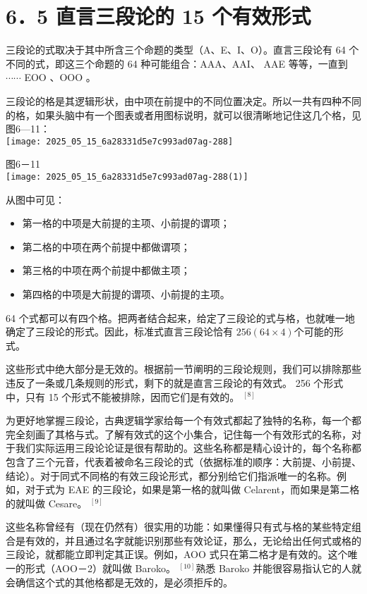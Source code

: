 \section*{6．5 直言三段论的 15 个有效形式}
三段论的式取决于其中所含三个命题的类型（A、E、I、O）。直言三段论有 64 个不同的式，即这三个命题的 64 种可能组合：AAA、AAI、 AAE 等等，一直到 $\cdots \cdots$ EOO $、 \mathrm{OOO}$ 。

三段论的格是其逻辑形状，由中项在前提中的不同位置决定。所以一共有四种不同的格，如果头脑中有一个图表或者用图标说明，就可以很清晰地记住这几个格，见图6—11：\\
\texttt{[image: 2025\_05\_15\_6a28331d5e7c993ad07ag-288]}

图6－11\\
\texttt{[image: 2025\_05\_15\_6a28331d5e7c993ad07ag-288(1)]}

从图中可见：

\begin{itemize}
  \item 第一格的中项是大前提的主项、小前提的谓项；
  \item 第二格的中项在两个前提中都做谓项；
  \item 第三格的中项在两个前提中都做主项；
  \item 第四格的中项是大前提的谓项、小前提的主项。
\end{itemize}

64 个式都可以有四个格。把两者结合起来，给定了三段论的式与格，也就唯一地确定了三段论的形式。因此，标准式直言三段论恰有 $256(64 \times 4)$个可能的形式。

这些形式中绝大部分是无效的。根据前一节阐明的三段论规则，我们可以排除那些违反了一条或几条规则的形式，剩下的就是直言三段论的有效式。 256 个形式中，只有 15 个形式不能被排除，因而它们是有效的。 ${ }^{[8]}$

为更好地掌握三段论，古典逻辑学家给每一个有效式都起了独特的名称，每一个都完全刻画了其格与式。了解有效式的这个小集合，记住每一个有效形式的名称，对于我们实际运用三段论论证是很有帮助的。这些名称都是精心设计的，每个名称都包含了三个元音，代表着被命名三段论的式（依据标准的顺序：大前提、小前提、结论）。对于同式不同格的有效三段论形式，都分别给它们指派唯一的名称。例如，对于式为 EAE 的三段论，如果是第一格的就叫做 Celarent，而如果是第二格的就叫做 Cesare。 ${ }^{[9]}$

这些名称曾经有（现在仍然有）很实用的功能：如果懂得只有式与格的某些特定组合是有效的，并且通过名字就能识别那些有效论证，那么，无论给出任何式或格的三段论，就都能立即判定其正误。例如，AOO 式只在第二格才是有效的。这个唯一的形式（AOO－2）就叫做 Baroko。 ${ }^{[10]}$熟悉 Baroko 并能很容易指认它的人就会确信这个式的其他格都是无效的，是必须拒斥的。

